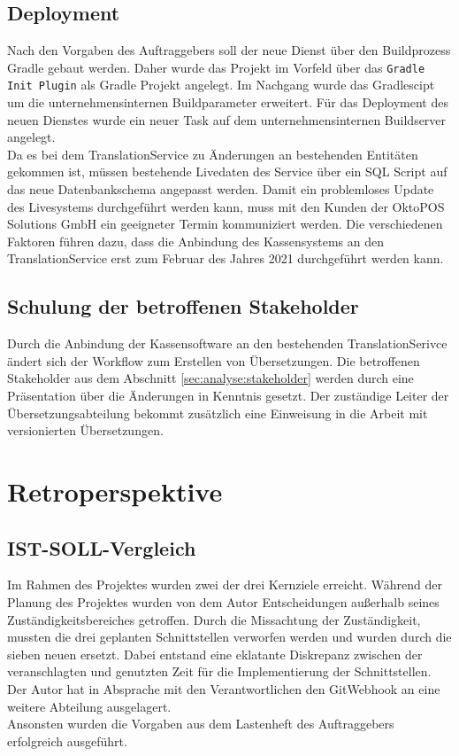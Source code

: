 \documentclass[10pt, oneside, ngerman]{article}
\begin{document}
    \subsection{Deployment}
      Nach den Vorgaben des Auftraggebers soll der neue Dienst über den Buildprozess Gradle gebaut werden. Daher wurde das Projekt im Vorfeld über das \lstinline{Gradle Init Plugin}
      als Gradle Projekt angelegt. Im Nachgang wurde das Gradlescipt um die unternehmensinternen Buildparameter erweitert. Für das Deployment des neuen Dienstes wurde
      ein neuer Task auf dem unternehmensinternen Buildserver angelegt.\\ 
      Da es bei dem TranslationService zu Änderungen an bestehenden Entitäten gekommen ist, müssen bestehende Livedaten des Service über ein SQL Script auf das neue Datenbankschema angepasst werden. 
      Damit ein problemloses Update des Livesystems durchgeführt werden kann, muss mit den Kunden der OktoPOS Solutions GmbH ein geeigneter Termin kommuniziert werden.
      Die verschiedenen Faktoren führen dazu, dass die Anbindung des Kassensystems an den TranslationService erst zum Februar des Jahres 2021 durchgeführt werden kann.
    
    \subsection{Schulung der betroffenen Stakeholder}
      Durch die Anbindung der Kassensoftware an den bestehenden TranslationSerivce ändert sich der Workflow zum Erstellen von Übersetzungen. Die betroffenen Stakeholder aus dem Abschnitt \ref{sec:analyse:stakeholder} werden durch eine Präsentation über die Änderungen in Kenntnis gesetzt. 
      Der zuständige Leiter der Übersetzungsabteilung bekommt zusätzlich eine Einweisung in die Arbeit mit versionierten Übersetzungen.
  \section{Retroperspektive}
  \subsection{IST-SOLL-Vergleich}
    Im Rahmen des Projektes wurden zwei der drei Kernziele erreicht. Während der Planung des Projektes wurden von dem Autor Entscheidungen außerhalb seines Zuständigkeitsbereiches getroffen. 
    Durch die Missachtung der Zuständigkeit, mussten die drei geplanten Schnittstellen verworfen werden und wurden durch die sieben neuen ersetzt. Dabei entstand eine eklatante Diskrepanz zwischen 
    der veranschlagten und genutzten Zeit für die Implementierung der Schnittstellen. Der Autor hat in Absprache mit den Verantwortlichen den GitWebhook
    an eine weitere Abteilung ausgelagert.\\
    Ansonsten wurden die Vorgaben aus dem Lastenheft des Auftraggebers erfolgreich ausgeführt. 
\end{document}

